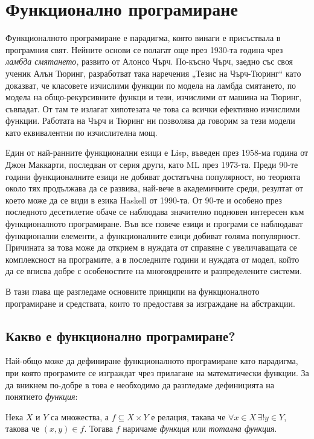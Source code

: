 \chapter{Функционално програмиране}
\label{ch:functional-programming}

Функционалното програмиране е парадигма, която винаги е присъствала в програмния свят. Нейните основи се полагат още през 1930-та година чрез \emph{ламбда смятането}, развито от Алонсо Чърч. По-късно Чърч, заедно със своя ученик Алън Тюринг, разработват така наречения „Тезис на Чърч-Тюринг“ като доказват, че класовете изчислими функции по модела на ламбда смятането, по модела на общо-рекурсивните функци и тези, изчислими от машина на Тюринг, съвпадат. От там те излагат хипотезата че това са всички ефективно изчислими функции. Работата на Чърч и Тюринг ни позволява да говорим за тези модели като еквивалентни по изчислителна мощ.

Един от най-ранните функционални езици е Lisp, въведен през 1958-ма година от Джон Маккарти, последван от серия други, като ML през 1973-та. Преди 90-те години функционалните езици не добиват достатъчна популярност, но теорията около тях продължава да се развива, най-вече в академичните среди, резултат от което може да се види в езика Haskell от 1990-та. От 90-те и особено през последното десетилетие обаче се наблюдава значително подновен интересен към функционалното програмиране. Във все повече езици и програми се наблюдават функционални елементи, а функционалните езици добиват голяма популярност. Причината за това може да открием в нуждата от справяне с увеличаващата се комплексност на програмите, а в последните години и нуждата от модел, който да се вписва добре с особеностите на многоядрените и разпределените системи.

В тази глава ще разгледаме основните принципи на функционалното програмиране и средствата, които то предоставя за изграждане на абстракции.

\section{Какво е функционално програмиране?}

Най-общо може да дефиниране функционалното програмиране като парадигма, при която програмите се изграждат чрез прилагане на математически функции. За да вникнем по-добре в това е необходимо да разгледаме дефиницията на понятието \emph{функция}:

\begin{definition}
  Нека $X$ и $Y$ са множества, а $f \subseteq X \times Y$ е релация, такава че $\forall x \in X\, \exists! y \in Y$, такова че $(x, y) \in f$. Тогава $f$ наричаме \emph{функция} или \emph{тотална функция}.
\end{definition}


